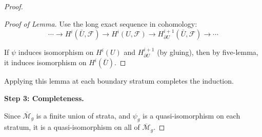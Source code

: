 \begin{proof}
\begin{proof}[Proof of Lemma]
Use the long exact sequence in cohomology:
$$\cdots \to H^i(\bar{U}, \mathcal{F}) \to H^i(U, \mathcal{F}) \to 
H^{i+1}_{\partial U}(\bar{U}, \mathcal{F}) \to \cdots$$

If $\psi$ induces isomorphism on $H^i(U)$ and $H^{i+1}_{\partial U}$ (by gluing), 
then by five-lemma, it induces isomorphism on $H^i(\bar{U})$.
\end{proof}

Applying this lemma at each boundary stratum completes the induction.

\textbf{Step 3: Completeness.}

Since $\overline{\mathcal{M}}_g$ is a finite union of strata, and $\psi_g$ is a 
quasi-isomorphism on each stratum, it is a quasi-isomorphism on all of $\overline{\mathcal{M}}_g$.
\end{proof}

